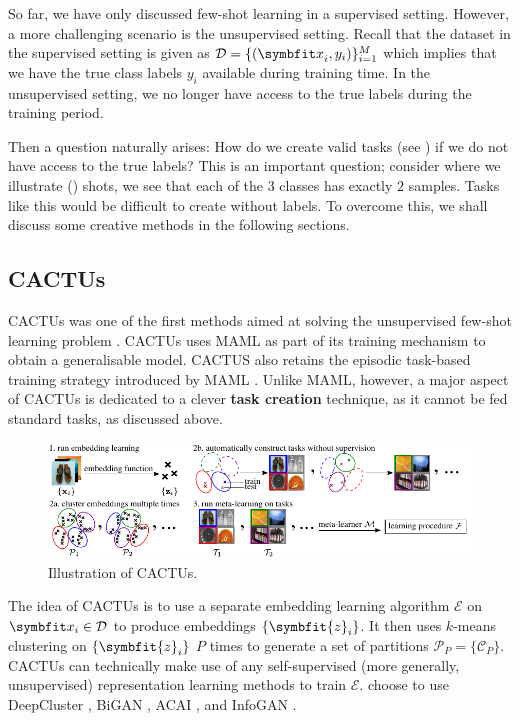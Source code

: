 So far, we have only discussed few-shot learning in a supervised setting. However, a more challenging scenario is the unsupervised setting. Recall that the dataset in the supervised setting is given as \(\mathcal{D} = \{({\symbfit x}_i, y_i)\}_{i = 1}^{M}\) which implies that we have the true class labels $y_i$ available during training time. In the unsupervised setting, we no longer have access to the true labels during the training period. 

Then a question naturally arises: How do we create valid tasks (see ) if we do not have access to the true labels? This is an important question; consider  where we illustrate () shots, we see that each of the $3$ classes has exactly $2$ samples. Tasks like this would be difficult to create without labels. To overcome this, we shall discuss some creative methods in the following sections.

\subsection{CACTUs}\label{ssec:ufsl-cactus}
CACTUs was one of the first methods aimed at solving the unsupervised few-shot learning problem \parencite{Hsu2018UnsupervisedMeta-Learning}. CACTUs uses MAML as part of its training mechanism to obtain a generalisable model. CACTUS also retains the episodic task-based training strategy introduced by MAML \parencite{Finn2017Model-agnosticNetworks}. Unlike MAML, however, a major aspect of CACTUs is dedicated to a clever \textbf{task creation} technique, as it cannot be fed standard tasks, as discussed above.
\begin{figure}[ht]
    \centering
    \includegraphics[width=\linewidth]{chapters/assets/fsl/cactus.pdf}
    \caption{Illustration of CACTUs. }
    \label{fig:cactus}
\end{figure}
The idea of CACTUs is to use a separate embedding learning algorithm $\mathcal{E}$ on $\bfitx_i \in \mathcal{D}$ to produce embeddings $\{\symbfit{z}_i\}$. It then uses $k$-means clustering on $\{\symbfit{z}_i\}$ $P$ times to generate a set of partitions $\mathcal{P}_P = \{\mathcal{C}_P\}$. CACTUs can technically make use of any self-supervised (more generally, unsupervised) representation learning methods to train $\mathcal{E}$. \textcite{Hsu2018UnsupervisedMeta-Learning} choose to use DeepCluster \parencite{caron2018deep}, BiGAN \parencite{berthelot2018understanding}, ACAI \parencite{donahue2016adversarial}, and InfoGAN \parencite{chen2016infogan}. 

